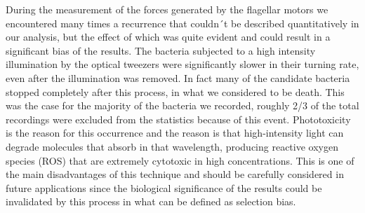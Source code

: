 \documentclass[a4paper,english,12pt,bibliography=totoc]{scrreprt}
\begin{document}
During the measurement of the forces generated by the flagellar motors we encountered many times a recurrence that couldn´t be described quantitatively in our analysis, but the effect of which was quite evident and could result in a significant bias of the results. The bacteria subjected to a high intensity illumination by the optical tweezers were significantly slower in their turning rate, even after the illumination was removed. In fact many of the candidate bacteria stopped completely after this process, in what we considered to be death.
This was the case for the majority of the bacteria we recorded, roughly 2/3 of the total recordings were excluded from the statistics because of this event.
Phototoxicity is the reason for this occurrence and the reason is that high-intensity light can degrade molecules that absorb in that wavelength, producing reactive oxygen species (ROS) that are extremely cytotoxic in high concentrations.
This is one of the main disadvantages of this technique and should be carefully considered in future applications since the biological significance of the results could be invalidated by this process in what can be defined as selection bias.\\
\end{document}

